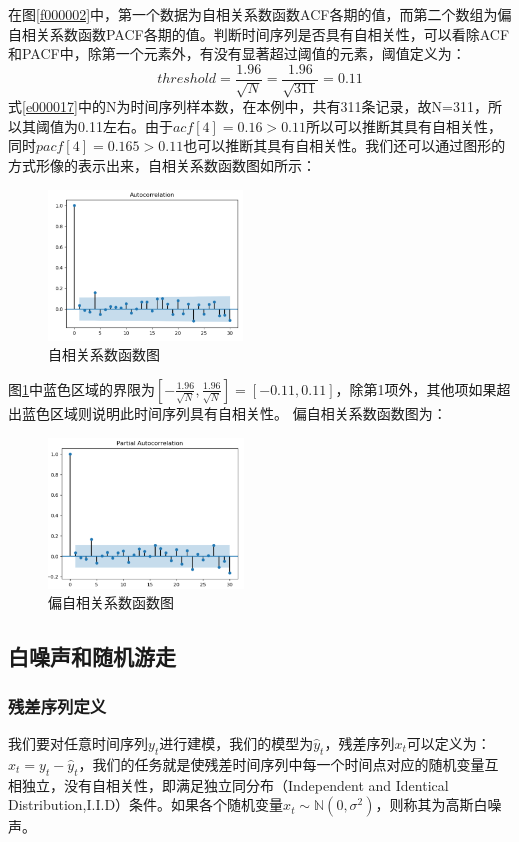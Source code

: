 \documentclass{article}
\begin{document}
在图\ref{f000002}中，第一个数据为自相关系数函数ACF各期的值，而第二个数组为偏自相关系数函数PACF各期的值。判断时间序列是否具有自相关性，可以看除ACF和PACF中，除第一个元素外，有没有显著超过阈值的元素，阈值定义为：
\begin{equation}
threshold=\frac{1.96}{\sqrt{N}} = \frac{1.96}{\sqrt{311}} = 0.11
\label{e000017}
\end{equation}
式\ref{e000017}中的N为时间序列样本数，在本例中，共有311条记录，故N=311，所以其阈值为0.11左右。由于$acf[4]=0.16>0.11$所以可以推断其具有自相关性，同时$pacf[4]=0.165>0.11$也可以推断其具有自相关性。我们还可以通过图形的方式形像的表示出来，自相关系数函数图如所示：
\begin{figure}[H]
	\caption{自相关系数函数图}
	\label{f000003}
	\centering
	\includegraphics[height=4cm]{images/f000003}
\end{figure}
图\ref{f000003}中蓝色区域的界限为$[-\frac{1.96}{\sqrt{N}}, \frac{1.96}{\sqrt{N}}]=[-0.11, 0.11]$，除第1项外，其他项如果超出蓝色区域则说明此时间序列具有自相关性。\newline
偏自相关系数函数图为：
\begin{figure}[H]
	\caption{偏自相关系数函数图}
	\label{f000004}
	\centering
	\includegraphics[height=4cm]{images/f000004}
\end{figure}
\subsection{白噪声和随机游走}
\subsubsection{残差序列定义}
我们要对任意时间序列$y_{t}$进行建模，我们的模型为$\hat{y}_{t}$，残差序列$x_{t}$可以定义为：$x_{t}=y_{t}-\hat{y}_{t}$，我们的任务就是使残差时间序列中每一个时间点对应的随机变量互相独立，没有自相关性，即满足独立同分布（Independent and Identical Distribution,I.I.D）条件。如果各个随机变量$x_{t} \sim \mathbb{N}(0, \sigma ^{2})$，则称其为高斯白噪声。\newline
\end{document}
